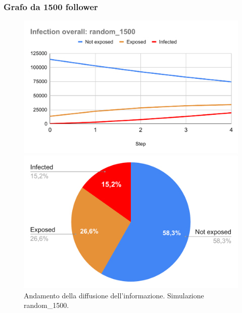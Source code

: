     \subsubsection{Grafo da 1500 follower}
        \begin{figure}[H]
            \centering
            \begin{minipage}[c]{0.55\textwidth}
                \includegraphics[width=\textwidth]{resources/charts/Infection overall_ random_1500.pdf}
            \end{minipage}
            \hfill
            \begin{minipage}[c]{0.44\textwidth}
                \includegraphics[width=\textwidth]{resources/charts/pie_random_1500.pdf}
            \end{minipage}
            \caption{Andamento della diffusione dell'informazione. Simulazione random\_1500.}
        \end{figure}
            
